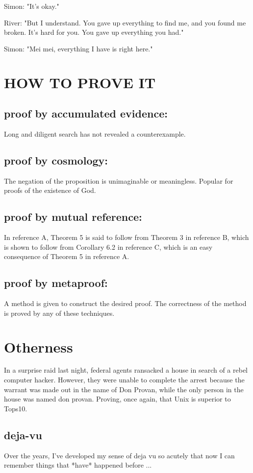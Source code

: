 \documentclass{BGSU}
\begin{document}
Simon: "It's okay."

River: "But I understand. You gave up everything to find me, and you found me
broken. It's hard for you. You gave up everything you had."

Simon: "Mei mei, everything I have is right here."

\chapter{HOW TO PROVE IT}

\section{proof by accumulated evidence:}

	Long and diligent search has not revealed a counterexample.

\section{proof by cosmology:}

	The negation of the proposition is unimaginable or 
	meaningless. Popular for proofs of the existence of God.

\section{proof by mutual reference:}

	In reference A, Theorem 5 is said to follow from Theorem 3 in 
	reference B, which is shown to follow from Corollary 6.2 in 
	reference C, which is an easy consequence of Theorem 5 in 
	reference A.

\section{proof by metaproof:}

	A method is given to construct the desired proof. The 
	correctness of the method is proved by any of these 
	techniques.

\chapter{Otherness}

In a surprise raid last night, federal agents ransacked a house in search
of a rebel computer hacker.  However, they were unable to complete the arrest
because the warrant was made out in the name of Don Provan, while the only
person in the house was named don provan.  Proving, once again, that Unix is
superior to Tops10.

\section{deja-vu}

Over the years, I've developed my sense of deja vu so acutely that now
I can remember things that *have* happened before ...

\backmatter


\appendix
\end{document}
